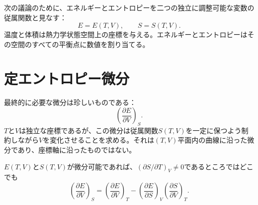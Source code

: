 次の議論のために、エネルギーとエントロピーを二つの独立に調整可能な変数の従属関数と見なす：
\begin{equation}
 E=E(T,V),
 \qquad
 S=S(T,V).
 \label{eq:sm5-dependent-functions}
\end{equation}
温度と体積は熱力学状態空間上の座標を与える。エネルギーとエントロピーはその空間のすべての平衡点に数値を割り当てる。

\section{定エントロピー微分}

最終的に必要な微分は珍しいものである：
\[
 \left(\frac{\partial E}{\partial V}\right)_S.
\]
\(T\)と\(V\)は独立な座標であるが、この微分は従属関数\(S(T,V)\)を一定に保つよう制約しながら\(V\)を変化させることを求める。それは\((T,V)\)平面内の曲線に沿った微分であり、座標軸に沿ったものではない。

\begin{classroomqa}
\end{classroomqa}

\begin{lemma}
\(E(T,V)\)と\(S(T,V)\)が微分可能であれば、\((\partial S/\partial T)_V\neq0\)であるところではどこでも
\begin{equation}
 \left(\frac{\partial E}{\partial V}\right)_S
 =
 \left(\frac{\partial E}{\partial V}\right)_T
 -
 \left(\frac{\partial E}{\partial S}\right)_V
 \left(\frac{\partial S}{\partial V}\right)_T.
 \label{eq:sm5-calculus-lemma}
\end{equation}
\end{lemma}

